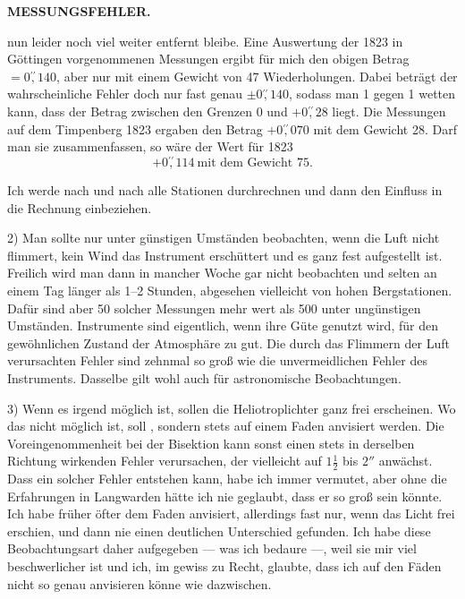 \par\clearpage
\noindent\null\hfill{\small\textbf{MESSUNGSFEHLER.}}\hfill{}\par\medskip
\noindent nun leider noch viel weiter entfernt bleibe. Eine Auswertung der 1823 in Göttingen vorgenommenen Messungen ergibt für mich den obigen Betrag $=0\overset{\prime\prime}{,}140$, aber nur mit einem Gewicht von 47 Wiederholungen. Dabei beträgt der wahrscheinliche Fehler doch nur fast genau $\pm0\overset{\prime\prime}{,}140$, sodass man 1 gegen 1 wetten kann, dass der Betrag zwischen den Grenzen $0$ und $+0\overset{\prime\prime}{,}28$ liegt. Die Messungen auf dem Timpenberg 1823 ergaben den Betrag $+0\overset{\prime\prime}{,}070$ mit dem Gewicht 28. Darf man sie zusammenfassen, so wäre der Wert für 1823
\[
+0\overset{\prime\prime}{,}114\ \text{mit dem Gewicht }75.
\]
\par\noindent\hspace*{\parindent}Ich werde nach und nach alle Stationen durchrechnen und dann den Einfluss in die Rechnung einbeziehen.

\par\noindent\hspace*{\parindent}2) Man sollte nur unter günstigen Umständen beobachten, wenn die Luft nicht flimmert, kein Wind das Instrument erschüttert und es ganz fest aufgestellt ist. Freilich wird man dann in mancher Woche gar nicht beobachten und selten an einem Tag länger als 1--2 Stunden, abgesehen vielleicht von hohen Bergstationen. Dafür sind aber 50 solcher Messungen mehr wert als 500 unter ungünstigen Umständen.  Instrumente sind eigentlich, wenn ihre Güte  genutzt wird, für den gewöhnlichen Zustand der Atmosphäre zu gut. Die durch das Flimmern der Luft verursachten Fehler sind zehnmal so groß wie die unvermeidlichen Fehler des Instruments. Dasselbe gilt wohl auch für astronomische Beobachtungen.

\par\noindent\hspace*{\parindent}3) Wenn es irgend möglich ist, sollen die Heliotroplichter ganz frei erscheinen. Wo das nicht möglich ist, soll , sondern stets auf einem Faden anvisiert werden. Die Voreingenommenheit bei der Bisektion kann sonst einen stets in derselben Richtung wirkenden Fehler verursachen, der vielleicht auf $1\frac12$ bis $2''$ anwächst. Dass ein solcher Fehler entstehen kann, habe ich immer vermutet, aber ohne die Erfahrungen in Langwarden hätte ich nie geglaubt, dass er so groß sein könnte. Ich habe früher öfter  dem Faden anvisiert, allerdings fast nur, wenn das Licht frei erschien, und dann nie einen deutlichen Unterschied gefunden. Ich habe diese Beobachtungsart daher aufgegeben --- was ich  bedaure ---, weil sie mir viel beschwerlicher ist und ich, im  gewiss zu Recht, glaubte, dass ich auf den Fäden nicht so genau anvisieren könne wie dazwischen.

